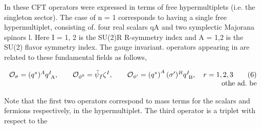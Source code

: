 \documentclass{article}
\begin{document}
In these CFT operators were expressed in terms of free hypermultiplets (i.e. the singleton
sector). The case of n = 1 corresponds to having a single free hypermultiplet, consisting of.
four real scalars qA and two symplectic Majorana spinors l. Here I = 1, 2 is the SU(2)R
R-symmetry index and A = 1,2 is the SU(2) flavor symmetry index. The gauge invariant.
operators appearing in are related to these fundamental fields as follows,


\begin{equation}
\begin{array} { r l } { \mathcal { O } _ { \sigma } = ( q ^ { * } ) ^ { A } q _ { \mathrm { ~ A } } ^ { I }, \qquad \mathcal { O } _ { \phi ^ { 0 } } = \tilde { \psi } _ { f } \zeta ^ { I }, \qquad \mathcal { O } _ { \phi ^ { \prime } } = \left ( q ^ { * } \right ) ^ { A } ( \sigma ^ { \prime } ) ^ { B } q _ { \mathrm { ~ B } } ^ { I }, \quad r = 1, 2, 3 \qquad ( 6 ) } \\ { \mathrm { ~ o t h e ~ a d. ~ b e}}\end{array}
\end{equation}


Note that the first two operators correspond to mass terms for the scalars and fermions
respectively, in the hypermultiplet. The third operator is a triplet with respect to the
\end{document}
